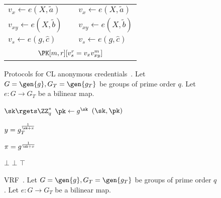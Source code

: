 \begin{figure}
\begin{tabular}{lcl}
    \(v_x\gets e(X, \tilde a)\)
    &
    & \(v_x\gets e(X, \tilde a)\)

    \\

    \(v_{xy}\gets e(X, \tilde b)\)
    &
    & \(v_{xy}\gets e(X, \tilde b)\)

    \\

    \(v_s\gets e(g, \hat c)\)
    &
    & \(v_s\gets e(g, \hat c)\)

    \\\\

    \multicolumn{3}{c}{\(\PK[m,r][v_s^r = v_x v_{xy}^m]\)}

    \\%
  \end{tabular}
  \caption{\label{ACacAlg}%
    Protocols for CL anonymous credentials~\cite{CLsignatures}.
    Let \(G = \gen{g}, G_T = \gen{g_T}\) be groups of prime order \(q\).
    Let \(e\colon G\to G_T\) be a bilinear map.
  }
\end{figure}

\begin{figure}
  \small
  \begin{minipage}[t]{0.40\linewidth}
    \begin{algorithmic}
      \Function{\DYprfSetup}{}
      \State $\sk\rgets \ZZ_q^*$
      \State $\pk\gets g^\sk$
      \State \Return $(\sk, \pk)$
      \EndFunction
    \end{algorithmic}

    \begin{algorithmic}
      \State \Return $y = g_T^{\frac{1}{\sk+x}}$
      \EndFunction
    \end{algorithmic}
  \end{minipage}
  \hfill
  \begin{minipage}[t]{0.58\linewidth}
    \begin{algorithmic}
      \State \Return $\pi = g^{\frac{1}{\sk+x}}$
      \EndFunction
    \end{algorithmic}

    \begin{algorithmic}
      \State \Return $\bot$
      \State \Return $\bot$
      \EndIf
      \State \Return $\top$
      \EndFunction
    \end{algorithmic}
  \end{minipage}
  \caption{\label{ACprfAlg}%
    \Acl{VRF}~\cite{DY-VRF}.
    Let \(G = \gen{g}, G_T = \gen{g_T}\) be groups of prime order \(q\).
    Let \(e\colon G\to G_T\) be a bilinear map.
  }
\end{figure}

